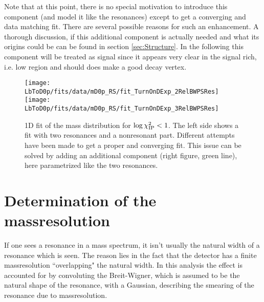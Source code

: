 Note that at this point, there is no special motivation to introduce this component (and model it like the resonances) except to get a converging and data matching fit.
There are several possible reasons for such an enhancement.
A thorough discussion, if this additional component is actually needed and what its origins could be can be found in section \ref{sec:Structure}.
In the following this component will be treated as signal since it appears very clear in the signal rich, i.e. low \logIP region and should does make a good decay vertex.
\begin{figure}[hptb]
    \centering
	\texttt{[image: LbToD0p/fits/data/mD0p\_RS/fit\_TurnOnDExp\_2RelBWPSRes]}
	\texttt{[image: LbToD0p/fits/data/mD0p\_RS/fit\_TurnOnDExp\_3RelBWPSRes]}
	\caption{1D fit of the \Dz\proton mass distribution for $\log \chi^2_{\text{IP}} < 1$. The left side shows a fit with two resonances and a nonresonant part. Different attempts have been made to get a proper and converging fit. This issue can be solved by adding an additional component (right figure, green line), here parametrized like the two resonances.}
    \label{fig:fit_mD0p_RS}
\end{figure}


\section{Determination of the massresolution}
\label{sec:Massresolution}
If one sees a resonance in a mass spectrum, it isn't usually the natural width of a resonance which is seen.
The reason lies in the fact that the detector has a finite massresolution ``overlapping" the natural width.
In this analysis the effect is accounted for by convoluting the Breit-Wigner, which is assumed to be the natural shape of the resonance, with a Gaussian, describing the smearing of the resonance due to massresolution.

